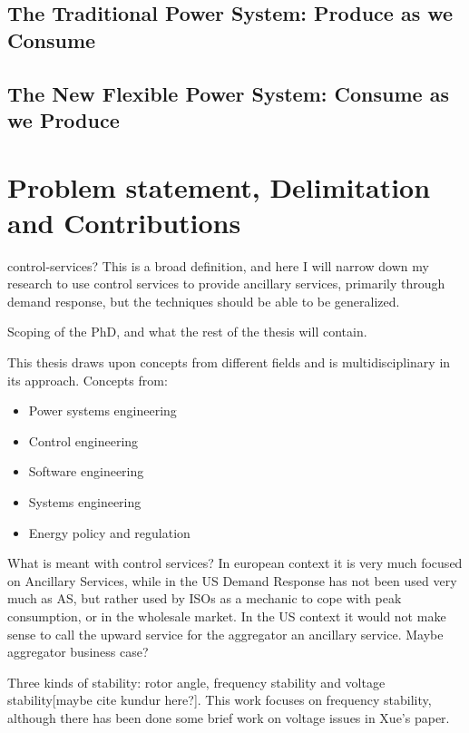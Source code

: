 \subsection*{The Traditional Power System: Produce as we Consume}
\label{sub:traditional}

\subsection*{The New Flexible Power System: Consume as we Produce}
\label{sub:future}


\section{Problem statement, Delimitation and Contributions} %
\label{sec:Funneling}
 control-services? This is a broad definition, and here I will  narrow down my research to use control services to provide ancillary services, primarily through demand response, but the techniques should be able to be generalized.

Scoping of the PhD, and what the rest of the thesis will contain.

This thesis draws upon concepts from different fields and is multidisciplinary in its approach. Concepts from:
\begin{itemize}
	\item Power systems engineering
	\item Control engineering
	\item Software engineering
	\item Systems engineering
	\item Energy policy and regulation
\end{itemize}

What is meant with control services? In european context it is very much focused on Ancillary Services, while in the US Demand Response has not been used very much as AS, but rather used by ISOs as a mechanic to cope with peak consumption, or in the wholesale market. In the US context it would not make sense to call the upward service for the aggregator an ancillary service. Maybe aggregator business case?

Three kinds of stability: rotor angle, frequency stability and voltage stability[maybe cite kundur here?]. This work focuses on frequency stability, although there has been done some brief work on voltage issues in Xue's paper. 

